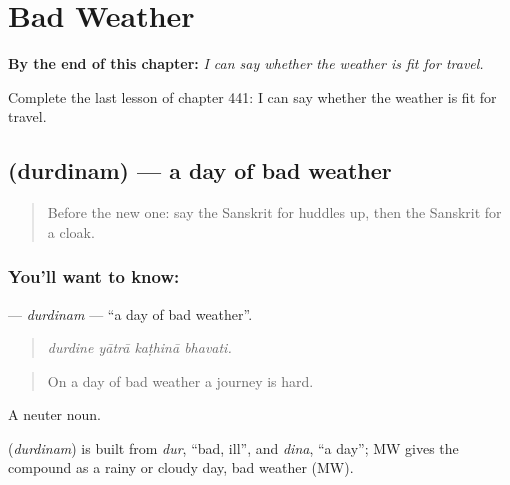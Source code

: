
\chapter{Bad Weather}
\label{ch:sa-bad-weather}

\begin{chapteropening}
\textbf{By the end of this chapter:} \emph{I can say whether the weather is fit for travel.}

Complete the last lesson of chapter 441: I can say whether the weather is fit for travel.
\end{chapteropening}

\section[\texorpdfstring{\sk{दुर्दिनम्} (durdinam)}{दुर्दिनम् (durdinam)}]{ (durdinam) — a day of bad weather}

\label{lesson:SA-C441-durdinam}



\begin{quote}
Before the new one: say the Sanskrit for huddles up, then the Sanskrit for a cloak.
\end{quote}

\subsection*{You'll want to know: }
\textbf{} — \emph{durdinam} — \textquotedblleft{}a day of bad weather\textquotedblright{}.

\begin{quote}
   
\end{quote}

\begin{quote}
\emph{durdine yātrā kaṭhinā bhavati.}
\end{quote}

\begin{quote}
On a day of bad weather a journey is hard.
\end{quote}

A neuter noun.

\begin{cousinweb}
\textbf{} (\emph{durdinam}) is built from \emph{dur}, \textquotedblleft{}bad, ill\textquotedblright{}, and \emph{dina}, \textquotedblleft{}a day\textquotedblright{}; MW gives the compound as a rainy or cloudy day, bad weather (MW).
\end{cousinweb}

